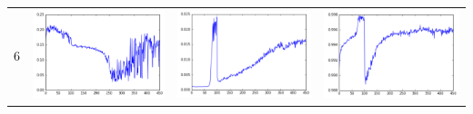 \documentclass[14pt, a4paper]{extarticle}
\begin{document}
\begin{table}[!htb]
{\begin{tabular}{|c|c|c|c|}
\hline
6 & \includegraphics[scale=0.3]{images/ks_6.png} & \includegraphics[scale=0.3]{images/cvm_6.png} & \includegraphics[scale=0.3]{images/auc_6.png} \\

\end{tabular}}
\end{table}
\end{document}
